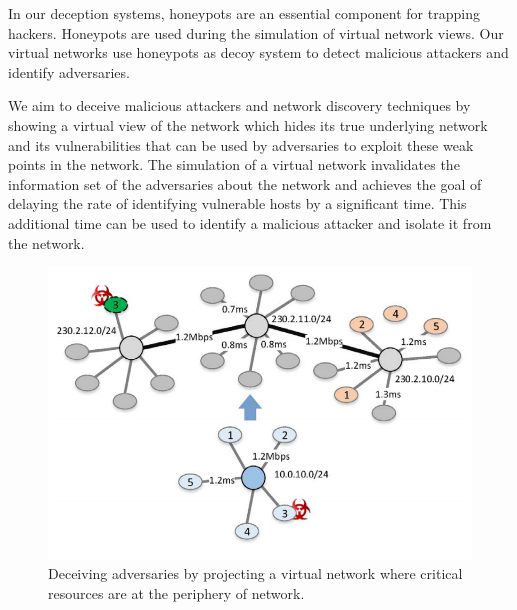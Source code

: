 In our deception systems, honeypots are an essential component for trapping hackers. Honeypots are used during the simulation of virtual network views. Our virtual networks use honeypots as decoy system  to detect malicious attackers and identify adversaries.

We aim to deceive malicious attackers and network discovery techniques by showing a virtual view of the network which hides its true underlying network and its vulnerabilities that can be used by adversaries to exploit these weak points in the network. The simulation of a virtual network invalidates the information set of the adversaries about the network and achieves the goal of delaying the rate of identifying vulnerable hosts by a significant time. This additional time can be used to identify a malicious attacker and isolate it from the network.

\FloatBarrier
\begin{figure}[!htbp]
\centering
  \includegraphics[scale=0.65]{Chap4/achle.png}
  \caption{Deceiving adversaries by projecting a virtual network where critical resources are at the periphery of network.}\label{fig:figure13}
\end{figure} 


